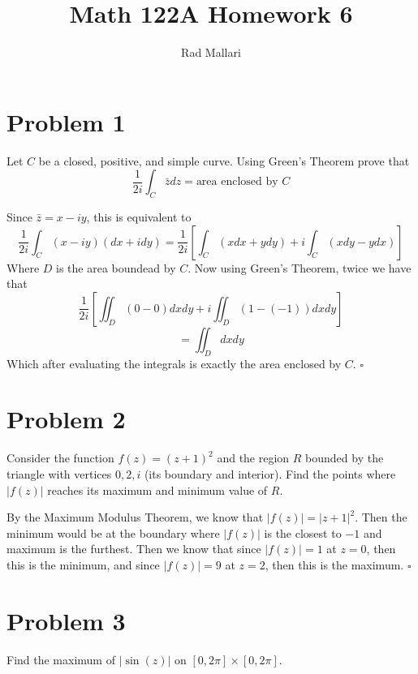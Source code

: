 \documentclass[12pt]{article}
\title{Math 122A Homework 6}
\author{Rad Mallari}
\newenvironment{proof}{\noindent{\bf Proof.}}{\hfill $\square$\medskip}
\begin{document}
\maketitle

\section{Problem 1}
Let $C$ be a closed, positive, and simple curve. Using Green's Theorem prove that
$$\frac{1}{2i}\int_{C}\bar{z}dz=\text{area enclosed by }C$$

\begin{proof}
    Since $\bar{z}=x-iy$, this is equivalent to
    $$\frac{1}{2i}\int_{C}(x-iy)(dx+idy)=\frac{1}{2i}\left
    [\int_{C}(xdx+ydy)+i\int_{C}(xdy-ydx)\right ]$$ Where $D$ is the area
    boundead by $C$. Now using Green's Theorem, twice we have that
    $$\frac{1}{2i}\left[\iint_{D}(0-0)dxdy+i\iint_{D}(1-(-1))dxdy\right]$$
    $$=\iint_{D}dxdy$$ Which after evaluating the integrals is exactly the area
    enclosed by $C$.
\end{proof}


\section{Problem 2}
Consider the function $f(z)=(z+1)^{2}$ and the region $R$ bounded by the
triangle with vertices $0,2,i$ (its boundary and interior). Find the points
where $\left |f(z)\right |$ reaches its maximum and minimum value of $R$.

\begin{proof}
    By the Maximum Modulus Theorem, we know that
    $\left|f(z)\right|=\left|z+1\right|^2$. Then the minimum would be at the
    boundary where $\left|f(z)\right|$ is the closest to $-1$ and maximum is the
    furthest. Then we know that since $\left|f(z)\right|=1$ at $z=0$, then this
    is the minimum, and since $\left|f(z)\right|=9$ at $z=2$, then this is the
    maximum.
\end{proof}


\section{Problem 3}
Find the maximum of $\left |\sin(z)\right |$ on $[0,2\pi]\times[0,2\pi]$.
\end{document}
